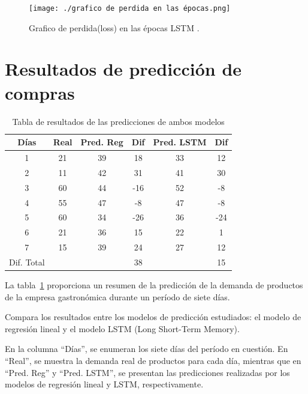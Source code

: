 \begin{figure}[H]
  \begin{center}
    \texttt{[image: ./grafico de perdida en las épocas.png]}
    \caption{Grafico de perdida(loss) en las épocas LSTM .}
    \label{fig:perdida}
  \end{center}
\end{figure}
\section{Resultados de predicción de compras}

\begin{table}[H]
  \centering
  \begin{tabular}{|c|c|c|c|c|c|}
    \hline
    \rowcolor{gray!50} \textbf{Días} & \textbf{Real} & \textbf{Pred. Reg} & \textbf{Dif} & \textbf{Pred. LSTM} & \textbf{Dif} \\
    \hline
    1 & 21 & 39 & 18 & 33 & 12 \\
    \hline
    2 & 11 & 42 & 31 & 41 & 30 \\
    \hline
    3 & 60 & 44 & -16 & 52 & -8 \\
    \hline
    4 & 55 & 47 & -8 & 47 & -8 \\
    \hline
    5 & 60 & 34 & -26 & 36 & -24 \\
    \hline
    6 & 21 & 36 & 15 & 22 & 1 \\
    \hline
    7 & 15 & 39 & 24 & 27 & 12 \\
    \hline
    Dif. Total &  &  & 38 &  & 15 \\
    \hline
  \end{tabular}
  \caption{ Tabla de resultados de las predicciones de ambos modelos}
  \label{tab:prediccion_final}
\end{table}

La tabla~\ref{tab:prediccion_final} proporciona un resumen de la predicción de la demanda de productos de la empresa gastronómica durante un período de siete días. 

\vspace{1\baselineskip}
Compara los resultados entre los modelos de predicción estudiados: el modelo de regresión lineal y el modelo LSTM (Long Short-Term Memory).

\vspace{1\baselineskip}
En la columna  “Días”, se enumeran los siete días del período en cuestión. En  “Real”, se muestra la demanda real de productos para cada día, mientras que en “Pred. Reg” y “Pred. LSTM”, se presentan las predicciones realizadas por los modelos de regresión lineal y LSTM, respectivamente.

